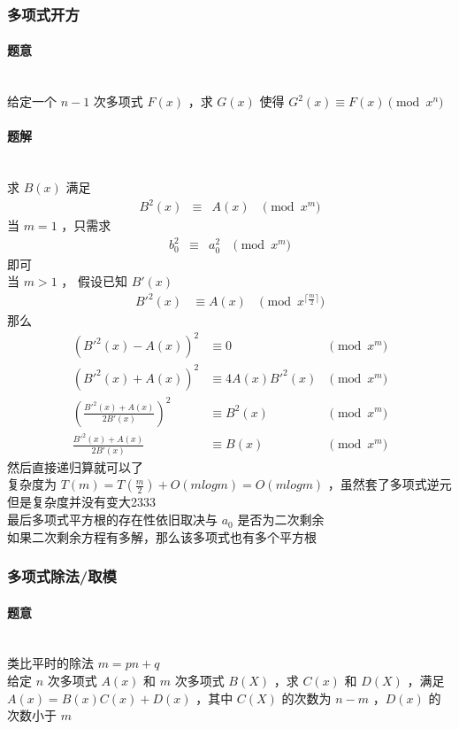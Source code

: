 	\subsubsection{多项式开方}
	\paragraph{题意}~\\
	给定一个 $n-1$ 次多项式 $F(x)$ ，求 $G(x)$ 使得 $G^2(x)\equiv F(x)\pmod {x^n}$
	\paragraph{题解}~\\
	求 $B(x)$ 满足
	$$
	\begin{aligned}
	B^2(x)&\equiv&A(x)&\pmod{x^m}
	\end{aligned}
	$$
	当 $m=1$ ，只需求
	$$
	\begin{aligned}
	b_0^2&\equiv&a_0^2&\pmod{x^m}
	\end{aligned}
	$$
	即可\\
	当 $m>1$ ，
	假设已知 $B'(x)$
	$$
	\begin{aligned}
	{B'}^2(x)&\equiv A(x)&\pmod{x^{\lceil\frac{m}{2} \rceil}}
	\end{aligned}
	$$
	那么
	$$
	\begin{aligned}
	({B'}^2(x)-A(x))^2&\equiv0&\pmod{x^m}\\
	({B'}^2(x)+A(x))^2&\equiv4A(x)B'^2(x)&\pmod{x^m}\\
	(\frac{ {B'}^2(x)+A(x)}{2B'(x)})^2&\equiv B^2(x)&\pmod{x^m}\\
	\frac{ {B'}^2(x)+A(x)}{2{B'}(x)}&\equiv B(x)&\pmod{x^m}
	\end{aligned}
	$$
	然后直接递归算就可以了\\
	复杂度为 $T(m)=T(\frac{m}{2})+O(mlogm)=O(mlogm)$ ，虽然套了多项式逆元但是复杂度并没有变大2333\\
	最后多项式平方根的存在性依旧取决与 $a_0$ 是否为二次剩余\\
	如果二次剩余方程有多解，那么该多项式也有多个平方根\\
	\vspace{1cm}
	\subsubsection{多项式除法/取模}
	\paragraph{题意}~\\
	类比平时的除法 $m=pn+q$\\
	给定 $n$ 次多项式 $A(x)$ 和 $m$ 次多项式 $B(X)$ ，求 $C(x)$ 和 $D(X)$ ，满足 $A(x)=B(x)C(x)+D(x)$ ，其中 $C(X)$ 的次数为 $n-m$ ，$D(x)$ 的次数小于 $m$
